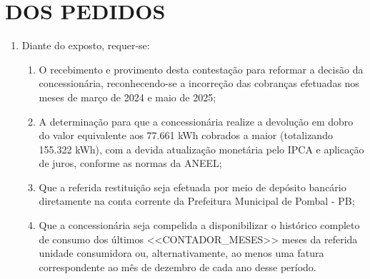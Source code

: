 \section{DOS PEDIDOS}

\begin{enumerate}[resume]
\item Diante do exposto, requer-se:
    \begin{enumerate}
    \item O recebimento e provimento desta contestação para reformar a decisão da concessionária, reconhecendo-se a incorreção das cobranças efetuadas nos meses de março de 2024 e maio de 2025;
    \item A determinação para que a concessionária realize a devolução em dobro do valor equivalente aos 77.661 kWh cobrados a maior (totalizando 155.322 kWh), com a devida atualização monetária pelo IPCA e aplicação de juros, conforme as normas da ANEEL;
    \item Que a referida restituição seja efetuada por meio de depósito bancário diretamente na conta corrente da Prefeitura Municipal de Pombal - PB;
    \item Que a concessionária seja compelida a disponibilizar o histórico completo de consumo dos últimos <<CONTADOR_MESES>> meses da referida unidade consumidora ou, alternativamente, ao menos uma fatura correspondente ao mês de dezembro de cada ano desse período.
    \end{enumerate}
\end{enumerate}